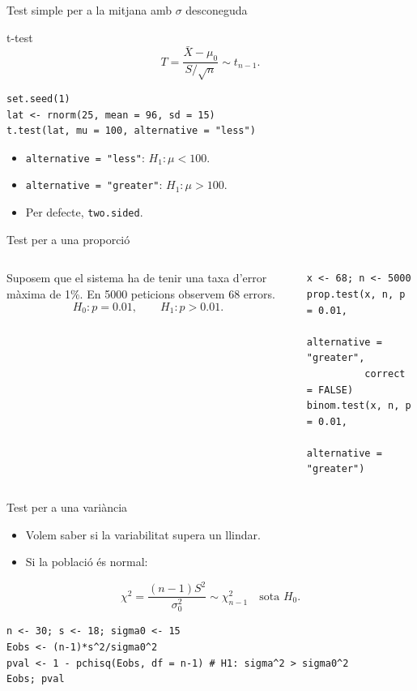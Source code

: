 \documentclass[10pt,aspectratio=169]{beamer}
\begin{document}
\begin{frame}[fragile]{Test simple per a la mitjana amb $\sigma$ desconeguda}
\begin{block}{t-test}
\[
T=\frac{\bar X-\mu_0}{S/\sqrt n}\sim t_{n-1}.
\]
\end{block}
\begin{lstlisting}
set.seed(1)
lat <- rnorm(25, mean = 96, sd = 15)
t.test(lat, mu = 100, alternative = "less")
\end{lstlisting}
\begin{itemize}
  \item \texttt{alternative = "less"}: $H_1:\mu<100$.
  \item \texttt{alternative = "greater"}: $H_1:\mu>100$.
  \item Per defecte, \texttt{two.sided}.
\end{itemize}
\end{frame}

\begin{frame}[fragile]{Test per a una proporció}
\begin{columns}[T]
Suposem que el sistema ha de tenir una taxa d'error màxima de 1\%.
En 5000 peticions observem 68 errors.
\[
H_0:p=0.01,\qquad H_1:p>0.01.
\]
\begin{lstlisting}
x <- 68; n <- 5000
prop.test(x, n, p = 0.01,
          alternative = "greater",
          correct = FALSE)
binom.test(x, n, p = 0.01,
           alternative = "greater")
\end{lstlisting}
\end{columns}
\end{frame}

\begin{frame}[fragile]{Test per a una variància}
\begin{itemize}
  \item Volem saber si la variabilitat supera un llindar.
  \item Si la població és normal:
\end{itemize}
\[
\chi^2=\frac{(n-1)S^2}{\sigma_0^2}\sim\chi^2_{n-1}\quad \text{sota }H_0.
\]
\begin{lstlisting}
n <- 30; s <- 18; sigma0 <- 15
Eobs <- (n-1)*s^2/sigma0^2
pval <- 1 - pchisq(Eobs, df = n-1) # H1: sigma^2 > sigma0^2
Eobs; pval
\end{lstlisting}
\end{frame}
\end{document}
